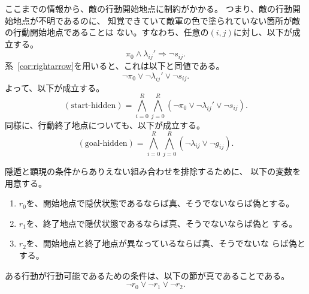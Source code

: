 ここまでの情報から、敵の行動開始地点に制約がかかる。
つまり、敵の行動開始地点が不明であるのに、
知覚できていて敵軍の色で塗られていない箇所が敵の行動開始地点であることは
ない。すなわち、任意の$(i, j)$に対し、以下が成立する。
\[
 \pi_0 \land \lambda_{ij}' \Rightarrow \lnot s_{ij}.
\]
系~\ref{cor:rightarrow}を用いると、これは以下と同値である。
\[
 \lnot \pi_0 \lor \lnot \lambda_{ij}' \lor \lnot s_{ij}.
\]
よって、以下が成立する。
\[
 (\text{start-hidden}) = \bigwedge_{i = 0}^R
 \bigwedge_{j = 0}^R
 \left(\lnot \pi_0 \lor \lnot \lambda_{ij}' \lor \lnot s_{ij} \right).
\]
同様に、行動終了地点についても、以下が成立する。
\[
 (\text{goal-hidden}) = \bigwedge_{i = 0}^R
 \bigwedge_{j = 0}^R
 \left(\lnot \lambda_{ij} \lor \lnot g_{ij} \right).
\]

隠遁と顕現の条件からありえない組み合わせを排除するために、
以下の変数を用意する。

\begin{nota} \label{nota:r_s}
 \begin{enumerate}[1.]
  \item $r_0$を、開始地点で隠伏状態であるならば真、そうでないならば偽とする。
  \item $r_1$を、終了地点で隠伏状態であるならば真、そうでないならば偽と
        する。
  \item $r_2$を、開始地点と終了地点が異なっているならば真、そうでないな
        らば偽とする。
 \end{enumerate}
\end{nota}

\begin{prop} \label{prop:kengen_inpuku}
 ある行動が行動可能であるための条件は、以下の節が真であることである。
 \begin{equation}
  \lnot r_0 \lor \lnot r_1 \lor \lnot r_2.
   \label{eq:kengen_inpuku}
 \end{equation}
\end{prop}

